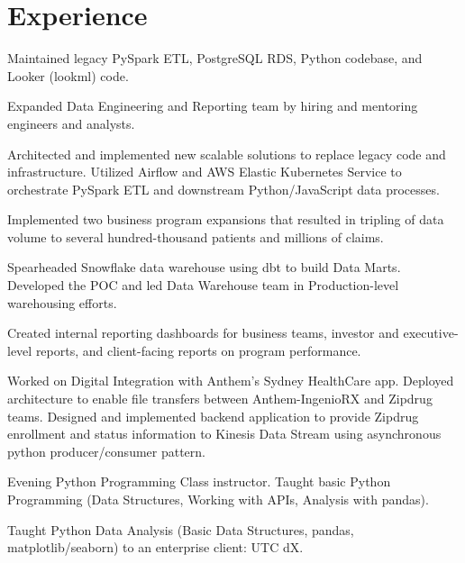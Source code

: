 \documentclass[]{snizami-resume}
\begin{document}
\begin{minipage}[t]{0.72\textwidth} 


\section{Experience}

\vspace{\topsep} %
\begin{tightemize}
\item Maintained legacy PySpark ETL, PostgreSQL RDS, Python codebase, and Looker (lookml) code.
\item Expanded Data Engineering and Reporting team by hiring and mentoring engineers and analysts.
\item Architected and implemented new scalable solutions to replace legacy code and infrastructure. Utilized Airflow and AWS Elastic Kubernetes Service to orchestrate PySpark ETL and downstream Python/JavaScript data processes.
\item Implemented two business program expansions that resulted in tripling of data volume to several hundred-thousand patients and millions of claims.
\item Spearheaded Snowflake data warehouse using dbt to build Data Marts. Developed the POC and led Data Warehouse team in Production-level warehousing efforts.
\item Created internal reporting dashboards for business teams, investor and executive-level reports, and client-facing reports on program performance.
\item Worked on Digital Integration with Anthem's Sydney HealthCare app. Deployed architecture to enable file transfers between Anthem-IngenioRX and Zipdrug teams. Designed and implemented backend application to provide Zipdrug enrollment and status information to Kinesis Data Stream using asynchronous python producer/consumer pattern.
\end{tightemize}
\sectionsep

\begin{tightemize}
\item Evening Python Programming Class instructor. Taught basic Python Programming (Data Structures, Working with APIs, Analysis with pandas).
\end{tightemize}
\begin{tightemize}
\item Taught Python Data Analysis (Basic Data Structures, pandas, matplotlib/seaborn) to an enterprise client: UTC dX.
\end{tightemize}
\sectionsep


\end{minipage}
\end{document}
